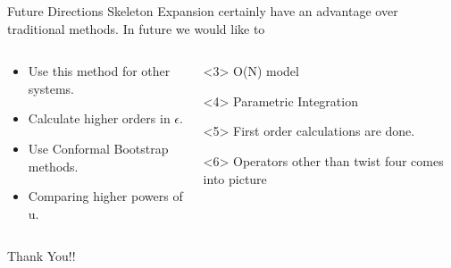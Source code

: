 \documentclass[pdf]{beamer}
\begin{document}
                 \begin{frame}{Future Directions}
                    Skeleton Expansion certainly have an advantage over traditional methods.
                     In future we would like to
                    \begin{columns}
                        \begin{column}{0.6\textwidth}
                            \begin{itemize}
                                \item <3-> Use this method for other systems.
                                \item <4-> Calculate higher orders in $\epsilon$.
                                \item <5-> Use Conformal Bootstrap methods.
                                \item <6-> Comparing higher powers of u.
                            \end{itemize}
                        \end{column}
                        \vline
                        \begin{column}{0.4\textwidth}
                            \centering
                            \begin{onlyenv}<3>
                                O(N) model
                            \end{onlyenv}
                            \begin{onlyenv}<4>
                                Parametric Integration
                            \end{onlyenv}
                            \begin{onlyenv}<5>
                                First order calculations are done.
                            \end{onlyenv}
                            \begin{onlyenv}<6>
                                Operators other than twist four comes into picture
                            \end{onlyenv}
                        \end{column}
                    \end{columns}
                 \end{frame}
                \begin{frame}
                    \begin{center}
                        \huge
                            Thank You!!
                    \end{center}
                \end{frame}


    
\end{document}
